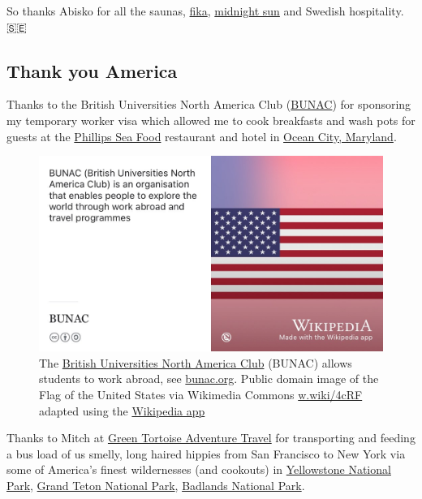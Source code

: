 \documentclass[
]{book}
\begin{document}
So thanks Abisko for all the saunas, \href{https://www.swedishfood.com/fika}{fika}, \href{https://en.wikipedia.org/wiki/Midnight_sun}{midnight sun} and Swedish hospitality. 🇸🇪🙏

\hypertarget{usa}{%
\subsection{Thank you America}\label{usa}}

Thanks to the British Universities North America Club (\href{https://en.wikipedia.org/wiki/BUNAC}{BUNAC}) for sponsoring my temporary worker visa which allowed me to cook breakfasts and wash pots for guests at the \href{https://phillipsseafood.com/}{Phillips Sea Food} restaurant and hotel in \href{https://en.wikipedia.org/wiki/Ocean_City,_Maryland}{Ocean City, Maryland}.

\begin{figure}

{\centering \includegraphics[width=0.99\linewidth]{images/BUNAC} 

}

\caption{The \href{https://en.wikipedia.org/wiki/BUNAC}{British Universities North America Club} (BUNAC) allows students to work abroad, see \href{https://bunac.org/}{bunac.org}. Public domain image of the Flag of the United States via Wikimedia Commons \href{https://w.wiki/4cRF}{w.wiki/4cRF} adapted using the \href{https://apps.apple.com/us/app/wikipedia/id324715238}{Wikipedia app}}\label{fig:bunac-fig}
\end{figure}



Thanks to Mitch at \href{https://greentortoise.com/}{Green Tortoise Adventure Travel} for transporting and feeding a bus load of us smelly, long haired hippies from San Francisco to New York via some of America's finest wildernesses (and cookouts) in \href{Yellowstone\%20National\%20Park}{Yellowstone National Park}, \href{Grand\%20Teton\%20National\%20Park}{Grand Teton National Park}, \href{https://en.wikipedia.org/wiki/Badlands_National_Park}{Badlands National Park}.
\end{document}
